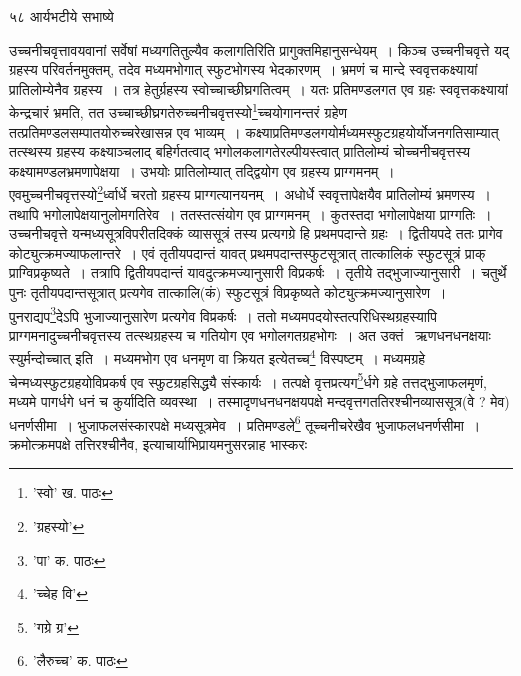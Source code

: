 \documentclass[11pt, openany]{book}
\begin{document}
{{{{{%

\vspace{3cm} ५८\hspace{4cm} आर्यभटीये सभाष्ये 

\vspace{0.3cm}
\noindent उच्चनीचवृत्तावयवानां सर्वेषां मध्यगतितुल्यैव कलागतिरिति प्रागुक्तमिहानुसन्धेयम्~। किञ्च उच्चनीचवृत्ते यद् ग्रहस्य परिवर्तनमुक्तम्, तदेव मध्यमभोगात् स्फुटभोगस्य भेदकारणम्~। भ्रमणं च मान्दे स्ववृत्तकक्ष्यायां प्रातिलोम्येनैव ग्रहस्य~। तत्र हेतुर्ग्रहस्य स्वोच्चाच्छीघ्रगतित्वम्~। यतः प्रतिमण्डलगत एव ग्रहः स्ववृत्तकक्ष्यायां केन्द्रचारं भ्रमति, तत उच्चाच्छीघ्रगतेरुच्चनीचवृत्तस्यो\renewcommand{\thefootnote}{१}\footnote{'स्वो' ख. पाठः}च्चयोगानन्तरं ग्रहेण
तत्प्रतिमण्डलसम्पातयोरुच्चरेखासन्न एव भाव्यम्~। कक्ष्याप्रतिमण्डलगयोर्मध्यमस्फुटग्रहयोर्योजनगतिसाम्यात् तत्स्थस्य ग्रहस्य कक्ष्याञ्चलाद् बहिर्गतत्वाद् भगोलकलागतेरल्पीयस्त्वात् प्रातिलोम्यं चोच्चनीचवृत्तस्य कक्ष्यामण्डलभ्रमणापेक्षया~। उभयोः प्रातिलोम्यात् तद्द्वियोग एव ग्रहस्य प्राग्गमनम्~। एवमुच्चनीचवृत्तस्यो\renewcommand{\thefootnote}{२}\footnote{'ग्रहस्यो'}र्ध्वार्धे चरतो ग्रहस्य प्राग्गत्यानयनम्~। अधोर्धे स्ववृत्तापेक्षयैव प्रातिलोम्यं भ्रमणस्य~। तथापि भगोलापेक्षयानुलोमगतिरेव~। ततस्तत्संयोग एव प्राग्गमनम्~। कुतस्तदा भगोलापेक्षया प्राग्गतिः~। उच्चनीचवृत्ते यन्मध्यसूत्रविपरीतदिक्कं व्याससूत्रं तस्य प्रत्यगग्रे हि प्रथमपदान्ते ग्रहः~। द्वितीयपदे ततः प्रागेव कोट्युत्क्रमज्याफलान्तरे~। एवं तृतीयपदान्तं यावत् प्रथमपदान्तस्फुटसूत्रात् तात्कालिकं स्फुटसूत्रं प्राक्
प्राग्विप्रकृष्यते~। तत्रापि द्वितीयपदान्तं यावदुत्क्रमज्यानुसारी विप्रकर्षः~। तृतीये तद्भुजाज्यानुसारी~। चतुर्थे पुनः तृतीयपदान्तसूत्रात् प्रत्यगेव तात्कालि(कं) स्फुटसूत्रं विप्रकृष्यते कोट्युत्क्रमज्यानुसारेण~। पुनराद्यप\renewcommand{\thefootnote}{३}\footnote{'पा' क. पाठः}देऽपि भुजाज्यानुसारेण प्रत्यगेव विप्रकर्षः~। ततो मध्यमपदयोस्तत्परिधिस्थग्रहस्यापि प्राग्गमनादुच्चनीचवृत्तस्य तत्स्थग्रहस्य च गतियोग एव भगोलगतग्रहभोगः~। अत उक्तं  \textendash\ {\qt ऋणधनधनक्षयाः स्युर्मन्दोच्चात्} इति~। मध्यमभोग एव धनमृण वा क्रियत इत्येतच्च\renewcommand{\thefootnote}{४}\footnote{'च्चेह वि'} विस्पष्टम्~। मध्यमग्रहे चेन्मध्यस्फुटग्रहयोविप्रकर्ष एव स्फुटग्रहसिद्ध्यै संस्कार्यः~। तत्पक्षे वृत्तप्रत्यग\renewcommand{\thefootnote}{५}\footnote{'गग्रे ग्र'}र्धगे ग्रहे
तत्तद्भुजाफलमृणं, मध्यमे पागर्धगे धनं च कुर्यादिति व्यवस्था~। तस्मादृणधनधनक्षयपक्षे मन्दवृत्तगततिरश्चीनव्याससूत्र(वे ? मेव) धनर्णसीमा~। भुजाफलसंस्कारपक्षे मध्यसूत्रमेव~। प्रतिमण्डले\renewcommand{\thefootnote}{६}\footnote{'लैरुच्च' क. पाठः} तूच्चनीचरेखैव भुजाफलधनर्णसीमा~। क्रमोत्क्रमपक्षे तत्तिरश्चीनैव, इत्याचार्याभिप्रायमनुसरन्नाह भास्करः\textendash 

}}}}}
\end{document}
